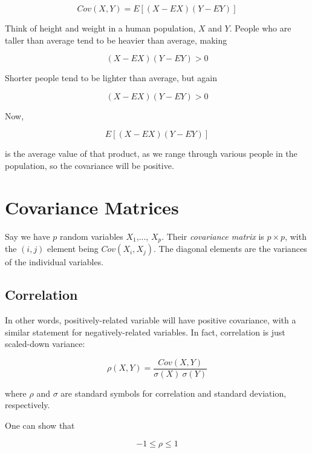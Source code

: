 \begin{equation}
Cov(X,Y) = E[(X - EX) (Y - EY)]
\end{equation}

Think of height and weight in a human population, $X$ and $Y$. People
who are taller than average tend to be heavier than average, making

\begin{equation}
(X - EX) (Y - EY) > 0
\end{equation}

Shorter people tend to be lighter than average, but again

\begin{equation}
(X - EX) (Y - EY) > 0
\end{equation}

Now, 

\begin{equation}
E[(X - EX) (Y - EY)]
\end{equation}

is the average value of that product, as we range through various people
in the population, so the covariance will be positive.

\section{Covariance Matrices}

Say we have $p$ random variables $X_1$,..., $X_p$.  Their
\textit{covariance matrix} is $p \times p$, with the $(i,j)$
element being $Cov(X_i,X_j)$.  The diagonal elements are the variances
of the individual variables.

\subsection{Correlation}

In other words, positively-related variable will have positive
covariance, with a similar statement for negatively-related variables.
In fact, correlation is just scaled-down variance:

\begin{equation}
\rho(X,Y) = 
\frac{Cov(X,Y)}{\sigma(X) ~ \sigma(Y)}
\end{equation}

where $\rho$ and $\sigma$ are standard symbols for correlation and
standard deviation, respectively.

One can show that 

\begin{equation}
-1 \leq \rho \leq 1
\end{equation}

